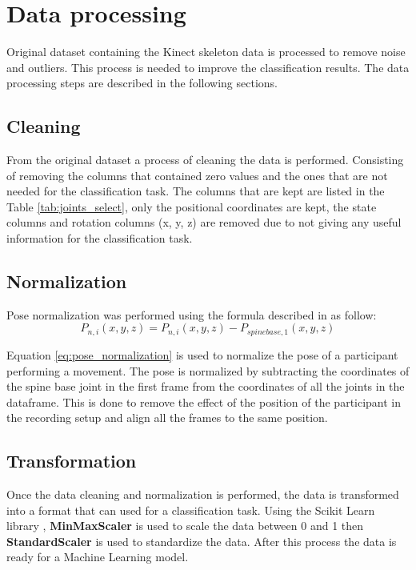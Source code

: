     \section{Data processing}

        Original dataset containing the Kinect skeleton data is processed to remove noise and outliers. This process is needed to improve the classification results. The data processing steps are described in the following sections.
        
        \subsection{Cleaning}
        
        From the original dataset a process of cleaning the data is performed. Consisting of removing the columns that contained zero values and the ones that are not needed for the classification task. The columns that are kept are listed in the Table \ref{tab:joints_select}, only the positional coordinates are kept, the state columns and rotation columns (x, y, z) are removed due to not giving any useful information for the classification task.

        \subsection{Normalization}

        Pose normalization was performed using the formula described in \cite{maudsley-barton_comparative_2017} as follow:
        \begin{equation}
            P_{n,i}(x,y,z) = P_{n,i}(x,y,z)-P_{spinebase,1}(x,y,z)
            \label{eq:pose_normalization}
        \end{equation}

        Equation \ref{eq:pose_normalization} is used to normalize the pose of a participant performing a movement. The pose is normalized by subtracting the coordinates of the spine base joint in the first frame from the coordinates of all the joints in the dataframe. This is done to remove the effect of the position of the participant in the recording setup and align all the frames to the same position. 

        \subsection{Transformation}

        Once the data cleaning and normalization is performed, the data is transformed into a format that can used for a classification task. Using the Scikit Learn library \cite{sklearn_api}, \textbf{MinMaxScaler} is used to scale the data between 0 and 1 then \textbf{StandardScaler} is used to standardize the data. After this process the data is ready for a Machine Learning model.

\cleardoublepage